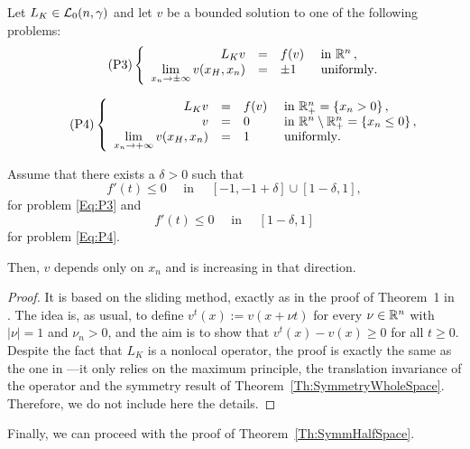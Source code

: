 \begin{proposition}
\label{Prop:HalfSpaceLimUnif}
Let $L_K \in \mathcal{L}_0(n,\gamma)$ and let $v$ be a bounded solution to one of the following problems:
\begin{equation}
\leqnomode
\tag{P3}
\label{Eq:P3}
\beqc{\PDEsystem}
L_K  v &=& f(v)  &\textrm{ in }\R^n\,,\\
\ds \lim_{x_n \to \pm \infty} v(x_H,x_n) &=& \pm 1 \,\,\, &\textrm{ uniformly}.
\eeqc
\end{equation}

\begin{equation}
\leqnomode
\tag{P4}
\label{Eq:P4}
\beqc{\PDEsystem}
L_K  v &=& f(v)  &\textrm{ in }\R^n_+ = \{ x_n>0\} \,,\\
v &=& 0  &\textrm{ in } \R^n \setminus \R^n_+ = \{ x_n\leq 0\}\,,\\
\ds \lim_{x_n \to + \infty} v(x_H,x_n) &=& 1 \,\,\, &\textrm{ uniformly}.
\eeqc
\end{equation}

\reqnomode

Assume that there exists a $\delta > 0$ such that
$$ f'(t) \leq 0 \quad \text{ in } \quad [-1,-1+\delta]\cup[1-\delta,1], $$
for problem \eqref{Eq:P3} and
$$ f'(t) \leq 0 \quad \text{ in } \quad [1-\delta,1] $$
for problem \eqref{Eq:P4}.

Then, $v$ depends only on $x_n$ and is increasing in that direction.
\end{proposition}

\begin{proof}
It is based on the sliding method, exactly as in the proof of Theorem~1 in \cite{BerestyckiHamelMonneau}. The idea is, as usual,   to define $ v^t(x) := v(x+\nu t) $ for every $\nu\in\mathbb{R}^n$ with $|\nu|=1$ and $\nu_n>0$, and the aim is to show that $v^t(x)-v(x)\geq 0$ for all $t\geq 0$. Despite the fact that $L_K$ is a nonlocal operator, the proof is exactly the same as the one in \cite{BerestyckiHamelMonneau} ---it only relies on the maximum principle, the translation invariance of the operator and the symmetry result of Theorem~\ref{Th:SymmetryWholeSpace}. Therefore, we do not include here the details.
\end{proof}






Finally, we can proceed with the proof of Theorem~\ref{Th:SymmHalfSpace}.

